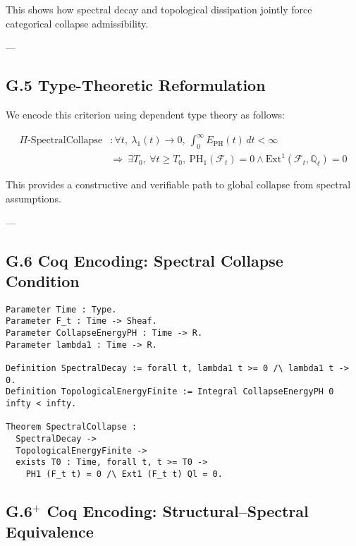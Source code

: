 \documentclass[11pt]{article}
\begin{document}
This shows how spectral decay and topological dissipation jointly force categorical collapse admissibility.

---

\subsection*{G.5 Type-Theoretic Reformulation}

We encode this criterion using dependent type theory as follows:

\begin{align*}
\Pi\text{-SpectralCollapse} &: \forall t,\ \lambda_1(t) \to 0,\ \int_0^\infty E_{\mathrm{PH}}(t)\,dt < \infty \\
&\Rightarrow\ \exists T_0,\ \forall t \geq T_0,\ \mathrm{PH}_1(\mathcal{F}_t) = 0 \wedge \mathrm{Ext}^1(\mathcal{F}_t, \mathbb{Q}_\ell) = 0
\end{align*}

This provides a constructive and verifiable path to global collapse from spectral assumptions.

---

\subsection*{G.6 Coq Encoding: Spectral Collapse Condition}
\label{sec:coq-spectral-collapse}

\begin{lstlisting}[language=Coq, caption={Coq Encoding: Spectral Collapse Criterion}]
Parameter Time : Type.
Parameter F_t : Time -> Sheaf.
Parameter CollapseEnergyPH : Time -> R.
Parameter lambda1 : Time -> R.

Definition SpectralDecay := forall t, lambda1 t >= 0 /\ lambda1 t -> 0.
Definition TopologicalEnergyFinite := Integral CollapseEnergyPH 0 infty < infty.

Theorem SpectralCollapse :
  SpectralDecay ->
  TopologicalEnergyFinite ->
  exists T0 : Time, forall t, t >= T0 ->
    PH1 (F_t t) = 0 /\ Ext1 (F_t t) Ql = 0.
\end{lstlisting}

\subsection*{G.6$^+$ Coq Encoding: Structural--Spectral Equivalence}
\label{sec:coq-spectral-structural-equiv}
\end{document}
